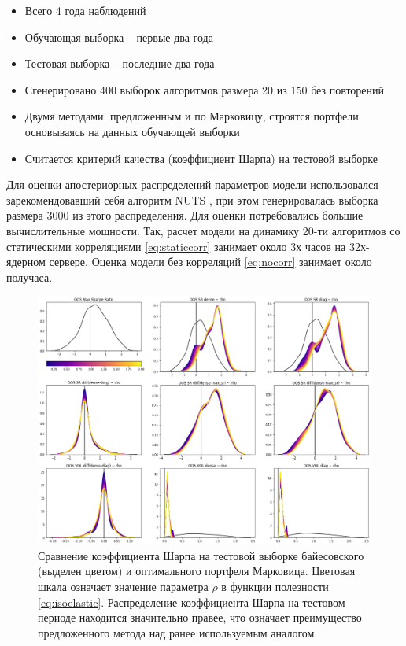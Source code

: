 \begin{itemize}
	\item Всего 4 года наблюдений
	\item Обучающая выборка -- первые два года
	\item Тестовая выборка -- последние два года
	\item Сгенерировано 400 выборок алгоритмов размера 20 из 150 без повторений
	\item Двумя методами: предложенным и по Марковицу, строятся портфели основываясь на данных обучающей выборки
	\item Считается критерий качества (коэффициент Шарпа) на тестовой выборке
\end{itemize}

Для оценки апостериорных распределений параметров модели использовался зарекомендовавший себя алгоритм NUTS \citep{hoffman2011nuts}, при этом генерировалась выборка размера 3000 из этого распределения. Для оценки потребовались большие вычислительные мощности. Так, расчет модели на динамику 20-ти алгоритмов со статическими корреляциями \eqref{eq:staticcorr} занимает около 3х часов на 32х-ядерном сервере. Оценка модели без корреляций \eqref{eq:nocorr} занимает около получаса. 

\begin{figure}[t]
	\centering
	\includegraphics[width=\linewidth]{Thesis/images/performance}
	\caption{Сравнение коэффициента Шарпа на тестовой выборке байесовского (выделен цветом) и оптимального портфеля Марковица. Цветовая шкала означает значение параметра $\rho$ в функции полезности \eqref{eq:isoelastic}. Распределение коэффициента Шарпа на тестовом периоде находится значительно правее, что означает преимущество предложенного метода над ранее используемым аналогом}
	\label{fig:performance}
\end{figure}

